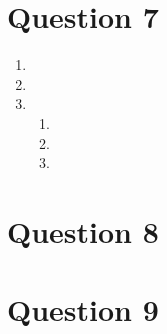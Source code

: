 \documentclass[a4paper, fleqn]{article}
\begin{document}
\section{Question 7}

\begin{enumerate}[label=(\alph{*})]
\item 
\item 
\item 
\begin{enumerate}[label=(\roman{*})]
\item 
\item 
\item 
\end{enumerate}
\end{enumerate}

\section{Question 8}

\section{Question 9}
\end{document}
